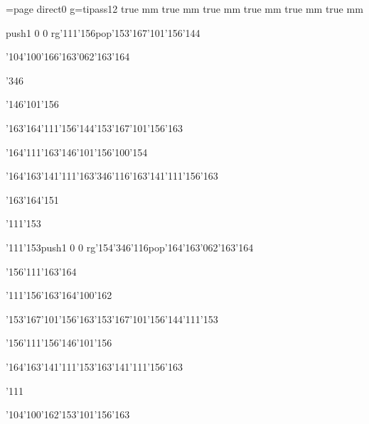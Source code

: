 \chardef\match=\pdfcolorstackinit page direct{0 g}\nopagenumbers\font\ipa=tipass12 true mm true mm true mm true mm true mm true mm
\null\vfill\ipa\centerline{\enskip\pdfcolorstack\match push{1 0 0 rg}\char'111\char'156\pdfcolorstack\match pop{}\enskip\enskip\enskip\enskip\enskip\char'153\char'167\char'101\char'156\char'144}\medskip\centerline{\enskip\enskip\enskip\char'104\char'100\char'166\enskip\char'163\char'062\char'163\char'164\enskip\enskip\enskip}\medskip\centerline{\enskip\char'346\enskip\enskip\enskip\enskip\enskip\enskip\enskip\enskip\enskip\enskip}\medskip\centerline{\enskip\enskip\enskip\enskip\enskip\enskip\enskip\enskip\enskip\enskip\enskip\char'146\char'101\char'156}\medskip\centerline{\enskip\enskip\enskip\enskip\enskip\char'163\char'164\char'111\char'156\char'144\enskip\char'153\char'167\char'101\char'156\char'163\enskip\enskip\enskip}\medskip\centerline{\enskip\enskip\enskip\char'164\char'111\char'163\enskip\char'146\char'101\char'156\enskip\enskip\enskip\enskip\enskip\char'100\char'154}\medskip\centerline{\enskip\char'164\char'163\char'141\char'111\char'163\enskip\char'346\char'116\enskip\char'163\char'141\char'111\char'156\char'163\enskip\enskip\enskip}\medskip\centerline{\enskip\enskip\enskip\char'163\char'164\char'151\enskip\enskip\enskip\enskip\enskip\enskip}\medskip\centerline{\enskip\char'111\char'153\enskip\enskip\enskip\enskip\enskip\enskip\enskip\enskip\enskip\enskip\enskip\enskip}\medskip\vfill\footline{\hfil\tt\folio\hfil}\eject
\null\vfill\ipa\centerline{\enskip\char'111\char'153\enskip\pdfcolorstack\match push{1 0 0 rg}\char'154\char'346\char'116\pdfcolorstack\match pop{}\enskip\char'164\char'163\char'062\char'163\char'164}\medskip\centerline{\enskip\enskip\enskip\enskip\enskip\enskip\enskip\char'156\char'111\char'163\char'164\enskip\enskip\enskip}\medskip\centerline{\enskip\enskip\enskip\enskip\enskip\enskip\enskip\enskip\enskip\enskip\enskip\enskip}\medskip\centerline{\enskip\enskip\enskip\enskip\char'111\char'156\char'163\enskip\enskip\enskip\enskip\char'164\char'100\char'162}\medskip\centerline{\enskip\enskip\enskip\enskip\enskip\char'153\char'167\char'101\char'156\char'163\enskip\char'153\char'167\char'101\char'156\char'144\enskip\char'111\char'153}\medskip\centerline{\enskip\enskip\enskip\enskip\enskip\enskip\enskip\char'156\char'111\char'156\enskip\char'146\char'101\char'156\enskip\enskip\enskip}\medskip\centerline{\enskip\char'164\char'163\char'141\char'111\char'153\enskip\enskip\enskip\enskip\char'163\char'141\char'111\char'156\char'163\enskip\enskip\enskip}\medskip\centerline{\enskip\char'111\enskip\enskip\enskip\enskip\enskip\enskip\enskip\enskip\enskip\enskip}\medskip\centerline{\enskip\enskip\enskip\enskip\enskip\enskip\enskip\char'104\char'100\char'162\enskip\char'153\char'101\char'156\char'163}\medskip\vfill\footline{\hfil\tt\folio\hfil}\eject
